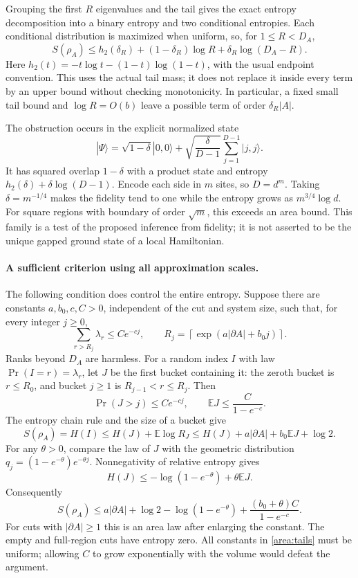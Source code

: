 \documentclass[11pt]{article}
\begin{document}
Grouping the first $R$ eigenvalues and the tail gives the exact
entropy decomposition into a binary entropy and two conditional
entropies. Each conditional distribution is maximized when uniform,
so, for $1\le R<D_A$,
\begin{equation}\label{area:onetail}
 S(\rho_A)\le h_2(\delta_R)
 +(1-\delta_R)\log R+\delta_R\log(D_A-R).
\end{equation}
Here $h_2(t)=-t\log t-(1-t)\log(1-t)$, with the usual endpoint
convention. This uses the actual tail mass; it does not replace it
inside every term by an upper bound without checking monotonicity.
In particular, a fixed small tail bound and $\log R=O(b)$ leave a
possible term of order $\delta_R|A|$.

The obstruction occurs in the explicit normalized state
\[
 |\Psi\rangle=\sqrt{1-\delta}|0,0\rangle
       +\sqrt{\frac{\delta}{D-1}}
                          \sum_{j=1}^{D-1}|j,j\rangle.
\]
It has squared overlap $1-\delta$ with a product state and entropy
$h_2(\delta)+\delta\log(D-1)$. Encode each side in $m$ sites,
so $D=d^m$. Taking $\delta=m^{-1/4}$ makes the fidelity tend to one
while the entropy grows as $m^{3/4}\log d$. For square regions with
boundary of order $\sqrt m$, this exceeds an area bound. This family
is a test of the proposed inference from fidelity; it is not asserted
to be the unique gapped ground state of a local Hamiltonian.

\paragraph{A sufficient criterion using all approximation scales.}
The following condition does control the entire entropy. Suppose there
are constants $a,b_0,c,C>0$, independent of the cut and system size,
such that, for every integer $j\ge0$,
\begin{equation}\label{area:tails}
 \sum_{r>R_j}\lambda_r\le Ce^{-cj},\qquad
 R_j=\left\lceil\exp(a|\partial A|+b_0j)\right\rceil.
\end{equation}
Ranks beyond $D_A$ are harmless. For a random index $I$ with law
$\Pr(I=r)=\lambda_r$, let $J$ be the first bucket containing it:
the zeroth bucket is $r\le R_0$, and bucket $j\ge1$ is
$R_{j-1}<r\le R_j$. Then
\[
 \Pr(J>j)\le Ce^{-cj},\qquad
 \mathbb EJ\le\frac{C}{1-e^{-c}}.
\]
The entropy chain rule and the size of a bucket give
\[
 S(\rho_A)=H(I)\le H(J)+\mathbb E\log R_J
 \le H(J)+a|\partial A|+b_0\mathbb EJ+\log2.
\]
For any $\theta>0$, compare the law of $J$ with the geometric
distribution $q_j=(1-e^{-\theta})e^{-\theta j}$. Nonnegativity of
relative entropy gives
\[
 H(J)\le-\log(1-e^{-\theta})+\theta\mathbb EJ.
\]
Consequently
\begin{equation}\label{area:entropy}
 S(\rho_A)\le a|\partial A|+\log2-\log(1-e^{-\theta})
       +\frac{(b_0+\theta)C}{1-e^{-c}}.
\end{equation}
For cuts with $|\partial A|\geq1$ this is an area law after enlarging the constant.
The empty and full-region cuts have entropy zero. All constants in
\eqref{area:tails} must be uniform; allowing $C$ to grow exponentially
with the volume would defeat the argument.
\end{document}
